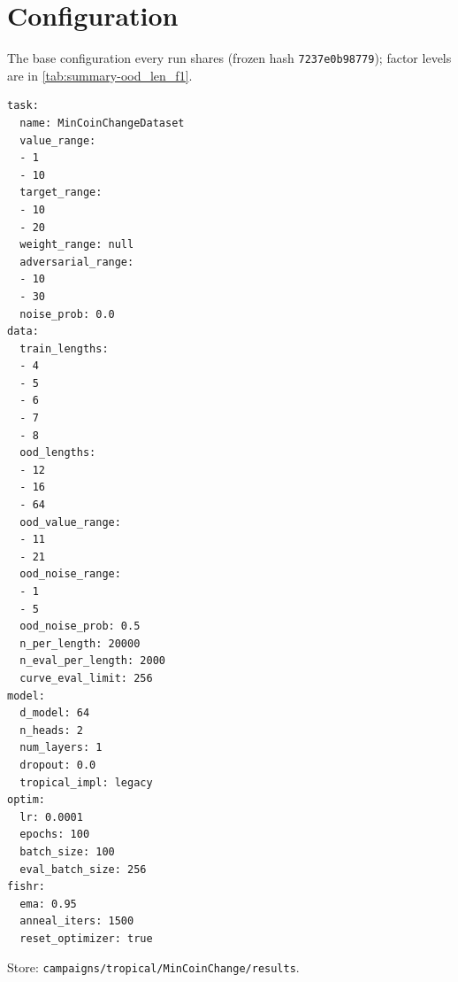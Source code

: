 \documentclass[10pt]{article}
\begin{document}
\section{Configuration}
The base configuration every run shares (frozen hash \texttt{7237e0b98779}); factor levels are in \autoref{tab:summary-ood_len_f1}.
{\footnotesize
\begin{verbatim}
task:
  name: MinCoinChangeDataset
  value_range:
  - 1
  - 10
  target_range:
  - 10
  - 20
  weight_range: null
  adversarial_range:
  - 10
  - 30
  noise_prob: 0.0
data:
  train_lengths:
  - 4
  - 5
  - 6
  - 7
  - 8
  ood_lengths:
  - 12
  - 16
  - 64
  ood_value_range:
  - 11
  - 21
  ood_noise_range:
  - 1
  - 5
  ood_noise_prob: 0.5
  n_per_length: 20000
  n_eval_per_length: 2000
  curve_eval_limit: 256
model:
  d_model: 64
  n_heads: 2
  num_layers: 1
  dropout: 0.0
  tropical_impl: legacy
optim:
  lr: 0.0001
  epochs: 100
  batch_size: 100
  eval_batch_size: 256
fishr:
  ema: 0.95
  anneal_iters: 1500
  reset_optimizer: true
\end{verbatim}
}
Store: \texttt{campaigns/tropical/MinCoinChange/results}.
\end{document}
